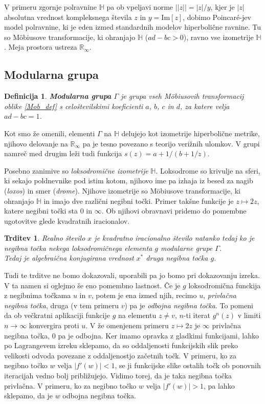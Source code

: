 \documentclass[a4paper,12pt]{article}
\def\R{\mathbb{R}} %
\def\H{\mathbb{H}} %
\newtheorem{trditev}{Trditev}
\newtheorem{definicija}{Definicija}
\begin{document}
V primeru zgornje polravnine $\H$ pa ob vpeljavi norme $||z|| = |z| / y$, kjer je $|z|$ absolutna vrednost kompleksnega števila $z$ in $y = \text{Im}[z]$, dobimo Poincar\'{e}-jev model polravnine, ki je eden izmed standardnih modelov hiperbolične ravnine. Tu so M\"obiusove transformacije, ki ohranjajo $\H$ ($ad - bc > 0$), ravno vse izometrije $\H$. Meja prostora ustreza $\R_{\infty}.$ 


\subsection{Modularna grupa}

\begin{definicija}
    \textbf{Modularna grupa} $\Gamma$ je grupa vseh M\"obiusovih transformacij oblike \eqref{Mob_def} s celoštevilskimi koeficienti $a$, $b$, $c$ in $d$, za katere velja $ad - bc = 1$.
\end{definicija}

Kot smo že omenili, elementi $\Gamma$ na $\H$ delujejo kot izometrije hiperbolične metrike, njihovo delovanje na $\R_{\infty}$ pa je tesno povezano s teorijo verižnih ulomkov. V grupi namreč med drugim leži tudi funkcija $s(z) = a + 1/(b + 1/z)$.

Posebno zanimive so \emph{loksodromične izometrije} $\H$. Loksodrome so krivulje na sferi, ki sekajo poldnevnike pod istim kotom, njihovo ime pa izhaja iz besed za nagib (\emph{loxos}) in smer (\emph{drome}). Njihove izometrije so M\"obiusove transformacije, ki ohranjajo $\H$ in imajo dve različni negibni točki. Primer takšne funkcije je $z \mapsto 2z$, katere negibni točki sta $0$ in $\infty$. Ob njihovi obravnavi pridemo do pomembne ugotovitve glede kvadratnih iracionalov.
\begin{trditev}
    \label{Lokso}
    Realno število $x$ je kvadratno iracionalno število natanko tedaj ko je negibna točka nekega loksodromičnega elementa $g$ modularne grupe $\Gamma$.\\
    Tedaj je algebraična konjugirana vrednost $x^*$ druga negibna točka $g$.
\end{trditev}

Tudi te trditve ne bomo dokazovali,  uporabili pa jo bomo pri dokazovanju izreka. V ta namen si oglejmo še eno pomembno lastnost. Če je $g$ loksodromična funckija z negibnima točkama $u$ in $v$, potem je ena izmed njih, recimo $u$, \emph{privlačna negibna točka}, druga (v tem primeru $v$) pa je \emph{odbojna negibna točka}. To pomeni da ob večkratni aplikaciji funkcije $g$ na elementu $z \neq v$, $n$-ti iterat $g^n(z)$ v limiti $n \to \infty$ konvergira proti $u$. V že omenjenem primeru $z \mapsto 2z$ je $\infty$ privlačna negibna točka, $0$ pa je odbojna. Ker imamo opravka z gladkimi funkcijami, lahko po Lagrangevem izreku sklepamo, da so oddaljenosti funkcijskih slik preko velikosti odvoda povezane z oddaljenostjo začetnih točk. V primeru, ko za negibno točko $w$ velja $|f'(w)| < 1$, se ji funkcijske slike ostalih točk ob ponovnih iteracijah vedno bolj približujejo. Vidimo torej, da je taka negibna točka privlačna. V primeru, ko za negibno točko $w$ velja $|f'(w)| > 1$, pa lahko sklepamo, da je $w$ odbojna negibna točka.
\end{document}
